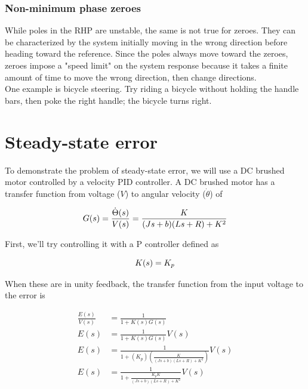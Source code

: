 \documentclass[10pt,conference,compsoc]{IEEEtran}
\begin{document}
\subsubsection{Non-minimum phase zeroes}

While poles in the RHP are unstable, the same is not true for zeroes. They can
be characterized by the \gls{system} initially moving in the wrong direction
before heading toward the \gls{reference}. Since the poles always move toward
the zeroes, zeroes impose a "speed limit" on the \gls{system} response because
it takes a finite amount of time to move the wrong direction, then change
directions. \\

One example is bicycle steering. Try riding a bicycle without holding the handle
bars, then poke the right handle; the bicycle turns right.

\section{Steady-state error}

To demonstrate the problem of \gls{steady-state error}, we will use a DC brushed
motor controlled by a velocity PID controller. A DC brushed motor has a transfer
function from voltage ($V$) to angular velocity ($\dot{\theta}$) of

\begin{equation}
  G(s) = \frac{\dot{\Theta}(s)}{V(s)} = \frac{K}{(Js+b)(Ls+R)+K^2} \\
\end{equation}

First, we'll try controlling it with a P controller defined as

\begin{equation*}
  K(s) = K_p \\
\end{equation*}

When these are in unity feedback, the transfer function from the input voltage
to the error is

\begin{align*}
  \frac{E(s)}{V(s)} &= \frac{1}{1 + K(s)G(s)} \\
  E(s) &= \frac{1}{1 + K(s)G(s)} V(s) \\
  E(s) &= \frac{1}{1 + (K_p) \left(\frac{K}{(Js+b)(Ls+R)+K^2}\right)} V(s) \\
  E(s) &= \frac{1}{1 + \frac{K_p K}{(Js+b)(Ls+R)+K^2}} V(s)
\end{align*}
\end{document}
